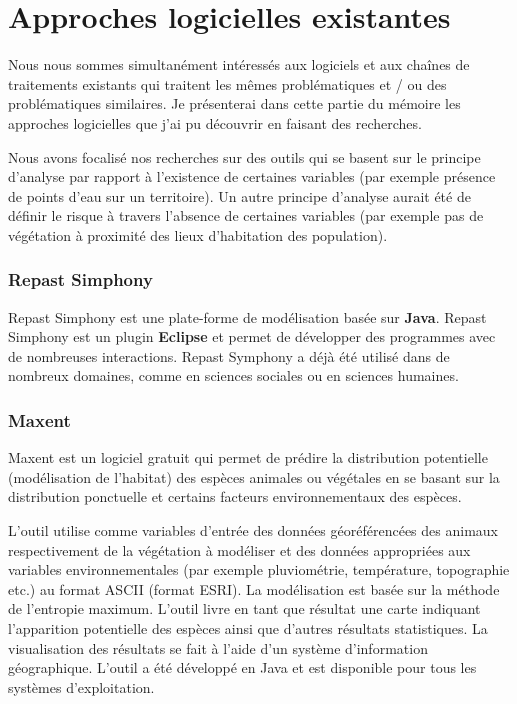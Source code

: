\section{Approches logicielles existantes}

Nous nous sommes simultanément intéressés aux logiciels et aux chaînes de traitements existants qui traitent les mêmes problématiques et / ou des problématiques similaires. Je présenterai dans cette partie du mémoire les approches logicielles que j'ai pu découvrir en faisant des recherches.

Nous avons focalisé nos recherches sur des outils qui se basent sur le principe d'analyse par rapport à l'existence de certaines variables (par exemple présence de points d'eau sur un territoire). Un autre principe d'analyse aurait été de définir le risque à travers l'absence de certaines variables (par exemple pas de végétation à proximité des lieux d'habitation des population).


\subsubsection{Repast Simphony}
Repast Simphony est une plate-forme de modélisation basée sur \textbf{Java}. Repast Simphony est un plugin \textbf{Eclipse} et permet de développer des programmes avec de nombreuses interactions. Repast Symphony a déjà été utilisé dans de nombreux domaines, comme en sciences sociales ou en sciences humaines. 


\subsubsection{Maxent}
Maxent est un logiciel gratuit qui permet de prédire la distribution potentielle (modélisation de l'habitat) des espèces animales ou végétales en se basant sur la distribution ponctuelle et certains facteurs environnementaux des espèces.

L'outil utilise comme variables d'entrée des données géoréférencées  des animaux respectivement de la végétation à modéliser et des données appropriées aux variables environnementales (par exemple pluviométrie, température, topographie etc.) au format ASCII (format ESRI). La modélisation est basée sur la méthode de l'entropie maximum. L'outil livre en tant que résultat une carte indiquant l'apparition potentielle des espèces ainsi que d'autres résultats statistiques. La visualisation des résultats se fait à l'aide d'un système d'information géographique. L'outil a été développé en Java et est disponible pour tous les systèmes d'exploitation.

